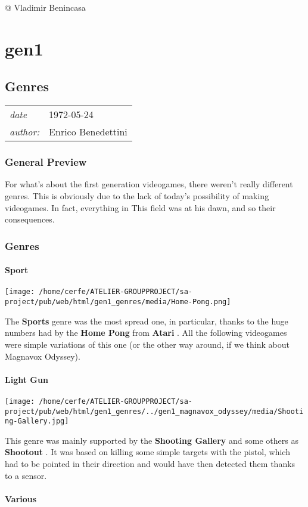 \documentclass[a4paper,10pt]{book}
\newcommand{\pageHeader}[4]{
    \section{#1}
    \vspace{-0.3cm}
    \begin{table}[h!]
     \begin{tabular}{ll}
        \hline
        \textit{date} & #2 \\
        \textit{author: } & #3\\
        \hline
     \end{tabular}
    \end{table}
    \vspace{-0.3cm}
}
\begin{document}
 
 @ Vladimir Benincasa 
 
 \newpage\chapter{gen1}\newpage\pageHeader{Genres}{1972-05-24}{Enrico Benedettini}{A briefly recap about the various first generation genres.}
 \subsection{General Preview }
 
          For what's about the first generation videogames, there weren't really different genres. This is
          obviously due to the lack of today's possibility of making videogames. In fact, everything in This
          field was at his dawn, and so their consequences.
         
 
 \subsection{Genres }
 \subsubsection{Sport }
 \texttt{[image: /home/cerfe/ATELIER-GROUPPROJECT/sa-project/pub/web/html/gen1\_genres/media/Home-Pong.png]}
 
          The  \textbf{Sports }  genre was the most spread one, in particular, thanks to the huge
          numbers had by the  \textbf{Home Pong }  from  \textbf{Atari } . All the following videogames
          were simple variations of this one (or the other way around, if we think about Magnavox Odyssey).
         
 
 \subsubsection{Light Gun }
 \texttt{[image: /home/cerfe/ATELIER-GROUPPROJECT/sa-project/pub/web/html/gen1\_genres/../gen1\_magnavox\_odyssey/media/Shooting-Gallery.jpg]}
 
          This genre was mainly supported by the  
 \textbf{Shooting Gallery }  and some others as  \textbf{Shootout } . It was based on killing some
          simple targets with the pistol, which had to be pointed in their direction and would have then detected
          them thanks to a sensor.
         
 
 \subsubsection{Various }
 
\end{document}
